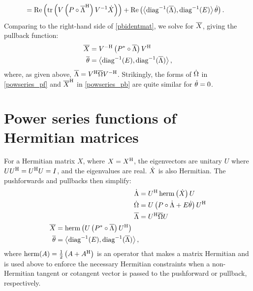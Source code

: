 \documentclass[../../main.tex]{subfiles}
\begin{document}
\begin{refsection}
\begin{align*}
		 & = \Re \left( \tr \left( V \left( P \circ {\overline{\Lambda}}^\mathrm{H} \right) V^{-1} \dot{X} \right) \right) +
		\Re \left( \left\langle \operatorname{diag}^{-1}(\overline{\Lambda}), \operatorname{diag}^{-1}(E) \right\rangle \dot{\theta} \right).
	\end{align*}
	Comparing to the right-hand side of \cref{pbidentmat}, we solve for $\overline{X}$, giving the pullback function:
	\begin{align}
		\begin{split}\label{powseries_pb}
			\overline{X}       & = {V}^{-\mathrm{H}} \left( {P}^* \circ \overline{\Lambda} \right) {V}^\mathrm{H} \\
			\overline{\theta}  & = \left\langle \operatorname{diag}^{-1}(E), \operatorname{diag}^{-1}(\overline{\Lambda}) \right\rangle,
		\end{split}
	\end{align}
	where, as given above, $\overline{\Lambda} = {V}^\mathrm{H} \overline{\Omega} {V}^{-\mathrm{H}}$.
	Strikingly, the forms of $\dot{\Omega}$ in \cref{powseries_pf} and ${\overline{X}}^\mathrm{H}$ in \cref{powseries_pb} are quite similar for $\dot{\theta}=0$.

	\section{Power series functions of Hermitian matrices}\label{power-series-functions-of-hermitian-matrices}

	For a Hermitian matrix $X$, where $X = {X}^\mathrm{H}$, the eigenvectors are unitary $U$ where $U {U}^\mathrm{H} = {U}^\mathrm{H} U = I$, and the eigenvalues are real.
	$\dot{X}$ is also Hermitian.
	The pushforwards and pullbacks then simplify:
	\begin{align}
		\dot{\Lambda} & = {U}^\mathrm{H} \operatorname{herm} \left( \dot{X} \right) U \nonumber   \\
		\dot{\Omega}  & = U \left( P \circ \dot{\Lambda} + E \dot{\theta} \right) {U}^\mathrm{H} \\
		\overline{\Lambda} & = {U}^\mathrm{H} \overline{\Omega} U \nonumber                                 \\
		\begin{split}
			\overline{X}       & = \operatorname{herm} \left( U \left( {P}^* \circ \overline{\Lambda} \right) {U}^\mathrm{H} \right) \\
			\overline{\theta}  & = \left\langle \operatorname{diag}^{-1}(E), \operatorname{diag}^{-1}(\overline{\Lambda}) \right\rangle,
		\end{split}
	\end{align}
	where $\operatorname{herm}(A) = \frac{1}{2} \left( A + {A}^\mathrm{H} \right)$ is an operator that makes a matrix Hermitian and is used above to enforce the necessary Hermitian constraints when a non-Hermitian tangent or cotangent vector is passed to the pushforward or pullback, respectively.


\end{refsection}
\end{document}
